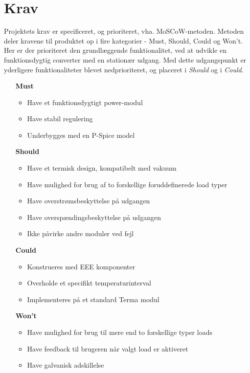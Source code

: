
\chapter{Krav}
Projektets krav er specificeret, og prioriteret, vha. MoSCoW-metoden\cite{MoSCoW}. Metoden deler kravene til produktet op i fire kategorier - Must, Should, Could og Won't. Her er der prioriteret den grundlæggende funktionalitet, ved at udvikle en funktionsdygtig converter med en stationær udgang. Med dette udgangspunkt er yderligere funktionaliteter blevet nedprioriteret, og placeret i \textit{Should} og i \textit{Could}. 

\begin{itemize}
	\item[\textbf{Must}]
	\begin{itemize}
		\item Have et funktionsdygtigt power-modul
		\item Have stabil regulering
		\item Underbygges med en P-Spice model
		
	\end{itemize}
	\item[\textbf{Should}]
	\begin{itemize}
		\item Have et termisk design, kompatibelt med vakuum
		\item Have mulighed for brug af to forskellige foruddefinerede load typer
		\item Have overstrømsbeskyttelse på udgangen
		\item Have overspændingsbeskyttelse på udgangen
		\item Ikke påvirke andre moduler ved fejl
		
	\end{itemize}
	\item[\textbf{Could}] 
	\begin{itemize}
		\item Konstrueres med EEE komponenter
		\item Overholde et specifikt temperaturinterval
		\item Implementeres på et standard Terma modul 
		
	\end{itemize}
	\item[\textbf{Won't}]
	\begin{itemize}
		\item Have mulighed for brug til mere end to forskellige typer loads
		\item Have feedback til brugeren når valgt load er aktiveret
		\item Have galvanisk adskillelse
		
	\end{itemize}
\end{itemize}

